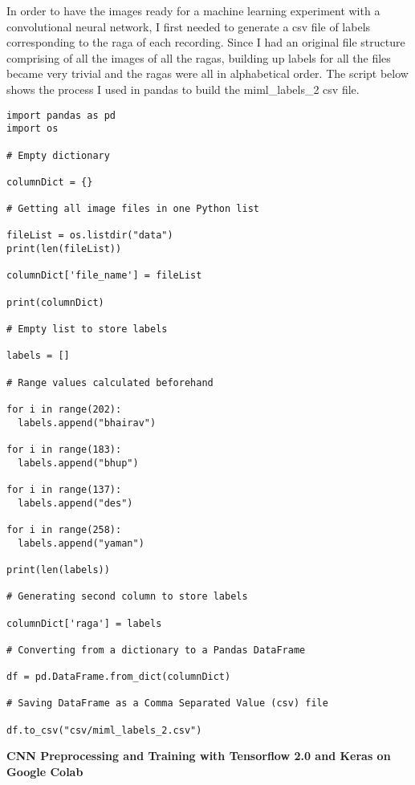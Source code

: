 In order to have the images ready for a machine learning experiment with a convolutional neural network, I first needed to generate a csv file of labels corresponding to the raga of each recording. Since I had an original file structure comprising of all the images of all the ragas, building up labels for all the files became very trivial and the ragas were all in
alphabetical order. The script below shows the process I used in pandas to build the miml\_labels\_2 csv file.

\begin{lstlisting}
import pandas as pd
import os

# Empty dictionary

columnDict = {}

# Getting all image files in one Python list

fileList = os.listdir("data")
print(len(fileList))

columnDict['file_name'] = fileList

print(columnDict)

# Empty list to store labels

labels = []

# Range values calculated beforehand

for i in range(202):
  labels.append("bhairav")

for i in range(183):
  labels.append("bhup")

for i in range(137):
  labels.append("des")

for i in range(258):
  labels.append("yaman")

print(len(labels))

# Generating second column to store labels

columnDict['raga'] = labels

# Converting from a dictionary to a Pandas DataFrame

df = pd.DataFrame.from_dict(columnDict)

# Saving DataFrame as a Comma Separated Value (csv) file

df.to_csv("csv/miml_labels_2.csv")

\end{lstlisting}

\begin{flushleft}
  \textbf{CNN Preprocessing and Training with Tensorflow 2.0 and Keras on Google Colab}
\end{flushleft}

